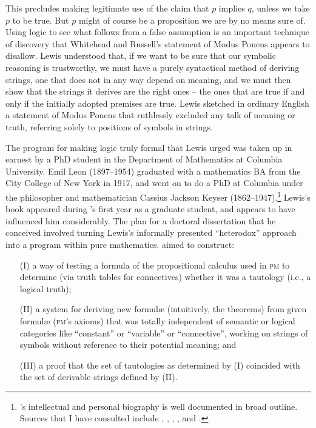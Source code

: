 \documentclass[output=paper]{langscibook}
\begin{document}
This precludes making legitimate use of the claim that $p$ implies $q$, unless we take $p$ to be true.  But $p$ might of course be a proposition we are by no means sure of.  Using logic to see what follows from a false assumption is an important technique of discovery that Whitehead and Russell's statement of Modus Ponens appears to disallow. Lewis understood that, if we want to be sure that our symbolic reasoning is trustworthy, we must have a purely syntactical method of deriving strings, one that does not in any way depend on meaning, and we must then show that the strings it derives are the right ones -- the ones that are true if and only if the initially adopted premises are true. Lewis sketched in ordinary English a statement of Modus Ponens that ruthlessly excluded any talk of meaning or truth, referring solely to positions of symbols in strings.

The program for making logic truly formal that Lewis urged was taken up in earnest by a PhD student in the Department of Mathematics at Columbia University. Emil Leon {\Post} (1897--1954) graduated with a mathematics BA from the City College of New York in 1917, and went on to do a PhD at Columbia under the philosopher and mathematician Cassius Jackson Keyser (1862--1947).\footnote{{\Post}'s intellectual and personal biography is well documented in broad outline. Sources that I have consulted include \citet{Davis94}, \citet{Stillwell04}, \citet{DeMol06}, \citet{Urquhart09}, and \citet{Jackson18}.} Lewis's book appeared during {\Post}'s first year as a graduate student, and appears to have influenced him considerably. The plan for a doctoral dissertation that he conceived involved turning Lewis's informally presented ``heterodox'' approach into a program within pure mathematics. {\Post} aimed to construct:

\begin{itemize}
\item[(I)]   a way of testing a formula of the propositional calculus used in \textsc{pm} to determine (via truth tables for connectives) whether it was a tautology (i.e., a logical truth); 
\item[(II)]  a system for deriving new formul{\ae} (intuitively, the theorems) from given formul{\ae} (\textsc{pm}'s axioms) that was totally independent of semantic or logical categories like ``constant'' or ``variable'' or ``connective'', working on strings of symbols without reference to their potential meaning; and 
\item[(III)] a proof that the set of tautologies as determined by (I) coincided with the set of derivable strings defined by (II).
\end{itemize} 
\end{document}
